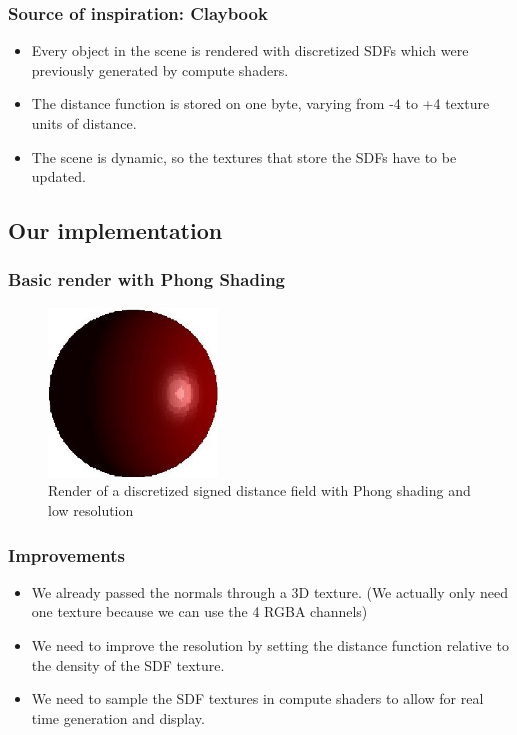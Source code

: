 \documentclass[handout]{beamer}
\begin{document}
\begin{frame}
  \frametitle{Source of inspiration: Claybook}
  \begin{itemize}
    \item Every object in the scene is rendered with discretized SDFs which were previously generated by compute shaders. 
    \item The distance function is stored on one byte, varying from -4 to +4 texture units of distance.
    \item The scene is dynamic, so the textures that store the SDFs have to be updated.
  \end{itemize}
\end{frame}

\subsection{Our implementation}
\begin{frame}
  \frametitle{Basic render with Phong Shading}
  \begin{figure}
    \centering
    \includegraphics[width=0.4\textwidth]{figures/discretized_sdf_256.JPG}
    \caption{Render of a discretized signed distance field with Phong shading and low resolution}
    \label{fig:discretized-sdf-implemetation}
  \end{figure}
\end{frame}

\begin{frame}
  \frametitle{Improvements}
  \begin{itemize}
    \item We already passed the normals through a 3D texture. (We actually only need one texture because we can use the 4 RGBA channels)
    \item We need to improve the resolution by setting the distance function relative to the density of the SDF texture.
    \item We need to sample the SDF textures in compute shaders to allow for real time generation and display.
  \end{itemize}
  
\end{frame}
\end{document}
